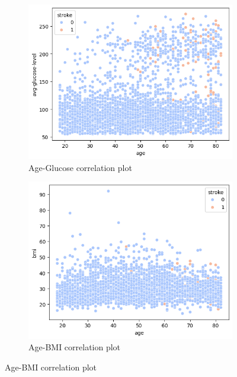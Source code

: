 \documentclass[twocolumn, 9pt]{extarticle}
\begin{document}
\begin{figure}[ht]
\begin{subfigure}[b]{\linewidth}
\centering
\includegraphics[scale=0.4]{images/age_glucose_plot.png}
\caption{Age-Glucose correlation plot}
\label{fig:age_glucose}
\end{subfigure}

\begin{subfigure}[b]{\linewidth}
\centering
\includegraphics[scale=0.4]{images/age_bmi_plot.png}
\caption{Age-BMI correlation plot}
\label{fig:age_bmi}
\end{subfigure}


\end{figure}
\end{document}
